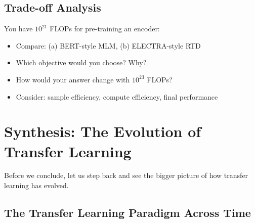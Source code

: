 \documentclass{article}
\begin{document}
\subsection{Trade-off Analysis}

You have $10^{21}$ FLOPs for pre-training an encoder:
\begin{itemize}
\item Compare: (a) BERT-style MLM, (b) ELECTRA-style RTD
\item Which objective would you choose? Why?
\item How would your answer change with $10^{23}$ FLOPs?
\item Consider: sample efficiency, compute efficiency, final performance
\end{itemize}

\section{Synthesis: The Evolution of Transfer Learning}

Before we conclude, let us step back and see the bigger picture of how transfer learning has evolved.

\subsection{The Transfer Learning Paradigm Across Time}
\end{document}
